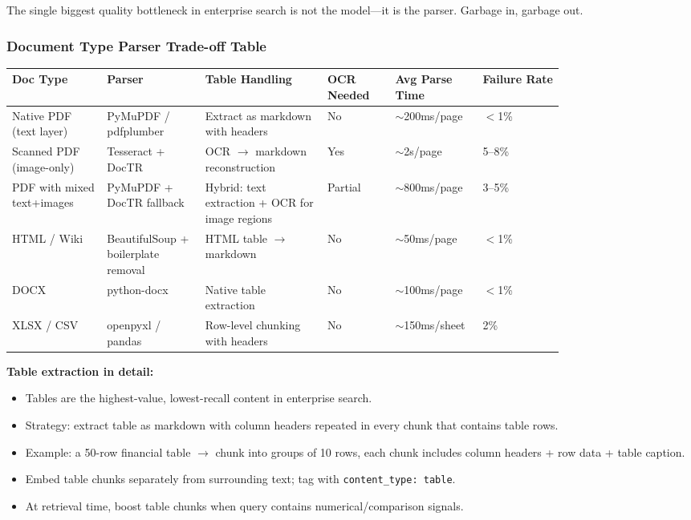 The single biggest quality bottleneck in enterprise search is not the model---it is the parser. Garbage in, garbage out.

\subsubsection*{Document Type Parser Trade-off Table}

\small
\begin{tabular}{|p{0.14\linewidth}|p{0.14\linewidth}|p{0.18\linewidth}|p{0.10\linewidth}|p{0.12\linewidth}|p{0.12\linewidth}|}
\hline
\textbf{Doc Type} & \textbf{Parser} & \textbf{Table Handling} & \textbf{OCR Needed} & \textbf{Avg Parse Time} & \textbf{Failure Rate} \\
\hline
Native PDF (text layer) & PyMuPDF / pdfplumber & Extract as markdown with headers & No & $\sim$200ms/page & $<$1\% \\
\hline
Scanned PDF (image-only) & Tesseract + DocTR & OCR $\rightarrow$ markdown reconstruction & Yes & $\sim$2s/page & 5--8\% \\
\hline
PDF with mixed text+images & PyMuPDF + DocTR fallback & Hybrid: text extraction + OCR for image regions & Partial & $\sim$800ms/page & 3--5\% \\
\hline
HTML / Wiki & BeautifulSoup + boilerplate removal & HTML table $\rightarrow$ markdown & No & $\sim$50ms/page & $<$1\% \\
\hline
DOCX & python-docx & Native table extraction & No & $\sim$100ms/page & $<$1\% \\
\hline
XLSX / CSV & openpyxl / pandas & Row-level chunking with headers & No & $\sim$150ms/sheet & 2\% \\
\hline
\end{tabular}
\normalsize

\textbf{Table extraction in detail:}

\begin{itemize}
  \item Tables are the highest-value, lowest-recall content in enterprise search.
  \item Strategy: extract table as markdown with column headers repeated in every chunk that contains table rows.
  \item Example: a 50-row financial table $\rightarrow$ chunk into groups of 10 rows, each chunk includes column headers + row data + table caption.
  \item Embed table chunks separately from surrounding text; tag with \texttt{content\_type: table}.
  \item At retrieval time, boost table chunks when query contains numerical/comparison signals.
\end{itemize}

